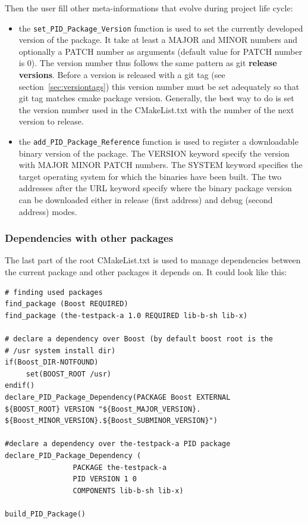 \documentclass[12pt,a4paper]{article}
\begin{document}
Then the user fill other meta-informations that evolve during project life cycle:
\begin{itemize}
\item the \texttt{set\_PID\_Package\_Version} function is used to set the currently developed version of the package. It take at least a MAJOR and MINOR numbers and optionally a PATCH number as arguments (default value for PATCH number is 0). The version number thus follows the same pattern as git \textbf{release versions}. Before a version is released with a git tag (see section~\ref{sec:versiontags}) this version number must be set adequately so that git tag matches cmake package version. Generally, the best way to do is set the version number used in the CMakeList.txt with the number of the next version to release.
\item the \texttt{add\_PID\_Package\_Reference} function is used to register a downloadable binary version of the package. The VERSION keyword specify the version with MAJOR MINOR PATCH numbers. The SYSTEM keyword specifies the target operating system for which the binaries have been built. The two addresses after the URL keyword specify where the binary package version can be downloaded either in release (first address) and debug (second address) modes.
\end{itemize}

\subsubsection{Dependencies with other packages}
\label{sec:rootCMakeDeps}

The last part of the root CMakeList.txt is used to manage dependencies between the current package and other packages it depends on. It could look like this:

\begin{verbatim}
# finding used packages
find_package (Boost REQUIRED)
find_package (the-testpack-a 1.0 REQUIRED lib-b-sh lib-x)

# declare a dependency over Boost (by default boost root is the 
# /usr system install dir)
if(Boost_DIR-NOTFOUND)
     set(BOOST_ROOT /usr)
endif()
declare_PID_Package_Dependency(PACKAGE Boost EXTERNAL 
${BOOST_ROOT} VERSION "${Boost_MAJOR_VERSION}.
${Boost_MINOR_VERSION}.${Boost_SUBMINOR_VERSION}")

#declare a dependency over the-testpack-a PID package
declare_PID_Package_Dependency (
                PACKAGE the-testpack-a
                PID VERSION 1 0 
                COMPONENTS lib-b-sh lib-x)
                
build_PID_Package()
\end{verbatim}
\end{document}
